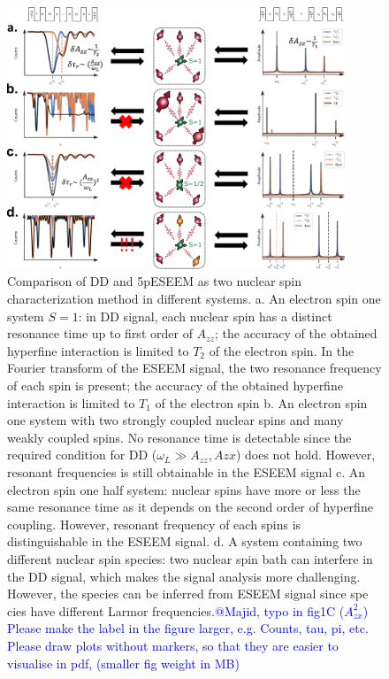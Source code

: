 \documentclass[%
 reprint,
superscriptaddress,
 amsmath,amssymb,
 aps,
]{revtex4-2}
\newcommand{\vvv}[1]{\textcolor{blue}{#1}}
\begin{document}
\begin{figure}%
	\begin{center}
		\includegraphics[width=0.9\textwidth]{pict/drawing0.pdf}
		\caption{Comparison of DD and 5pESEEM as two nuclear spin characterization method in different systems. a. An electron spin one system $S=1$: in DD signal, each nuclear spin has a distinct resonance time up to first order of $A_{zz}$; the accuracy of the obtained hyperfine interaction is limited to $T_2$ of the electron spin. In the Fourier transform of the ESEEM signal, the two resonance frequency of each spin is present; the accuracy of the obtained hyperfine interaction is limited to $T_1$ of the electron spin b. An electron spin one system with two strongly coupled nuclear spins and many weakly coupled spins. No resonance time is detectable since the required condition for DD ($\omega_L \gg A_{zz}, A{zx}$) does not hold. However, resonant frequencies is still obtainable in the ESEEM signal c. An electron spin one half system: nuclear spins have more or less the same resonance time as it depends on the second order of hyperfine coupling. However, resonant frequency of each spins is distinguishable in the ESEEM signal. d. A system containing two different nuclear spin species: two nuclear spin bath can interfere in the DD signal, which makes the signal analysis more challenging. However, the species can be inferred from ESEEM signal since spe cies have different Larmor frequencies.\vvv{@Majid, typo in fig1C ($A_{zx}^2$) Please make the label in the figure larger, e.g. Counts, tau, pi, etc. Please draw plots without markers, so that they are easier to visualise in pdf, (smaller fig weight in MB)}}
		\label{fig:1}
	\end{center}
\end{figure}
\end{document}
